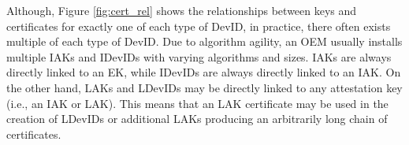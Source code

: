 \vspace{2em}
Although, Figure \ref{fig:cert_rel} shows the relationships between keys and certificates for exactly one of each type of DevID, in practice, there often exists multiple of each type of DevID. Due to algorithm agility, an OEM usually installs multiple IAKs and IDevIDs with varying algorithms and sizes. IAKs are always directly linked to an EK, while IDevIDs are always directly linked to an IAK. On the other hand, LAKs and LDevIDs may be directly linked to any attestation key (i.e., an IAK or LAK). This means that an LAK certificate may be used in the creation of LDevIDs or additional LAKs producing an arbitrarily long chain of certificates. 

